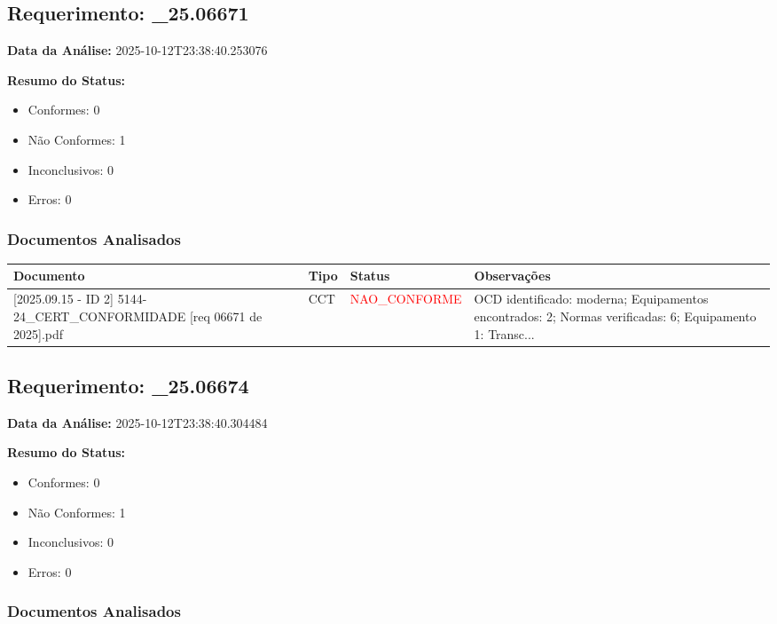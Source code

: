 \documentclass[12pt,a4paper]{article}
\begin{document}
\subsection{Requerimento: \_25.06671}

\textbf{Data da Análise:} 2025-10-12T23:38:40.253076

\textbf{Resumo do Status:}
\begin{itemize}
    \item Conformes: 0
    \item Não Conformes: 1
    \item Inconclusivos: 0
    \item Erros: 0
\end{itemize}

\subsubsection{Documentos Analisados}

\begin{longtable}{|p{4cm}|p{2cm}|p{2cm}|p{6cm}|}
\hline
\textbf{Documento} & \textbf{Tipo} & \textbf{Status} & \textbf{Observações} \\
\hline
\endhead
[Certificado de Conformidade Técnica - CCT][2025.09.15 - ID 2] 5144-24\_CERT\_CONFORMIDADE [req 06671 de 2025].pdf & CCT & \textcolor{red}{NAO\_CONFORME} & OCD identificado: moderna; Equipamentos encontrados: 2; Normas verificadas: 6; Equipamento 1: Transc... \\
\hline
\end{longtable}


\subsection{Requerimento: \_25.06674}

\textbf{Data da Análise:} 2025-10-12T23:38:40.304484

\textbf{Resumo do Status:}
\begin{itemize}
    \item Conformes: 0
    \item Não Conformes: 1
    \item Inconclusivos: 0
    \item Erros: 0
\end{itemize}

\subsubsection{Documentos Analisados}
\end{document}
